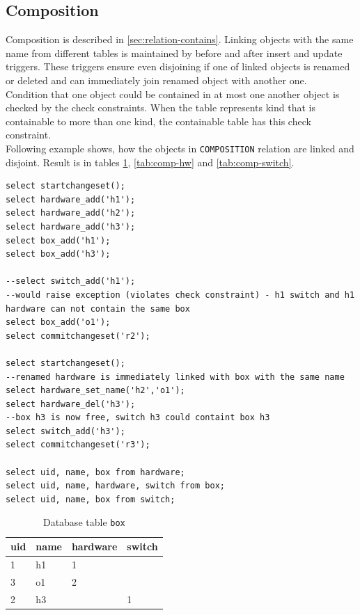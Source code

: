 \documentclass[deska]{subfiles}
\begin{document}
\subsection{Composition}
Composition is described in \ref{sec:relation-contains}.
Linking objects with the same name from different tables is maintained by before and after insert and update triggers. These triggers ensure even disjoining if one of linked objects is renamed or deleted and can immediately join renamed object with another one.\\
Condition that one object could be contained in at most one another object is checked by the check constraints. When the table represents kind that is containable to more than one kind, the containable table has this check constraint.\\
Following example shows, how the objects in {\tt COMPOSITION} relation are linked and disjoint. Result is in tables \ref{tab:comp-box}, \ref{tab:comp-hw} and \ref{tab:comp-switch}.

\begin{verbatim}
select startchangeset();
select hardware_add('h1');
select hardware_add('h2');
select hardware_add('h3');
select box_add('h1');
select box_add('h3');

--select switch_add('h1');
--would raise exception (violates check constraint) - h1 switch and h1 hardware can not contain the same box
select box_add('o1');
select commitchangeset('r2');

select startchangeset();
--renamed hardware is immediately linked with box with the same name
select hardware_set_name('h2','o1');
select hardware_del('h3');
--box h3 is now free, switch h3 could containt box h3
select switch_add('h3');
select commitchangeset('r3');

select uid, name, box from hardware;
select uid, name, hardware, switch from box;
select uid, name, box from switch;
\end{verbatim}

\begin{longtable}{ l | l | l | l }
    \caption{Database table {\tt box}}
    \label{tab:comp-box} \\
    uid & name & hardware & switch\\
    \hline
    \endhead
    1 & h1 & 1 & \\
    3 & o1 & 2 & \\
    2 & h3 &  & 1\\
    \hline
\end{longtable}
\end{document}
